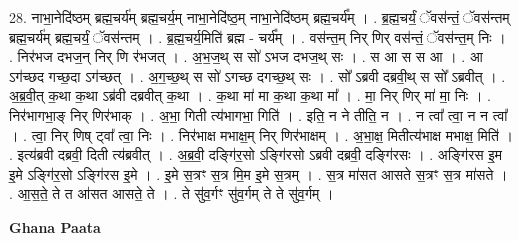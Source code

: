 \documentclass[17pt]{extarticle}
\begin{document}
28. नाभा॒नेदि॑ष्ठम् ब्रह्म॒चर्य॑म् ब्रह्म॒चर्य॒म् नाभा॒नेदि॑ष्ठ॒म् नाभा॒नेदि॑ष्ठम् ब्रह्म॒चर्य᳚म् । . ब्र॒ह्म॒चर्यं॒ ॅवस॑न्तं॒ ॅवस॑न्तम् ब्रह्म॒चर्य॑म् ब्रह्म॒चर्यं॒ ॅवस॑न्तम् । . ब्र॒ह्म॒चर्य॒मिति॑ ब्रह्म - चर्य᳚म् । . वस॑न्त॒म् निर् णिर् वस॑न्तं॒ ॅवस॑न्त॒म् निः । . निर॑भज दभज॒न् निर् णि र॑भजत् । . अ॒भ॒ज॒थ् स सो॑ ऽभज दभज॒थ् सः । . स आ स स आ । . आ ऽग॑च्छद गच्छ॒दा ऽग॑च्छत् । . अ॒ग॒च्छ॒थ् स सो॑ ऽगच्छ दगच्छ॒थ् सः । . सो᳚ ऽब्रवी दब्रवी॒थ् स सो᳚ ऽब्रवीत् । . अ॒ब्र॒वी॒त् क॒था क॒था ऽब्र॑वी दब्रवीत् क॒था । . क॒था मा॑ मा क॒था क॒था मा᳚ । . मा॒ निर् णिर् मा॑ मा॒ निः । . निर॑भागभा॒ङ् निर् णिर॑भाक् । . अ॒भा॒ गिती त्य॑भागभा॒ गिति॑ । . इति॒ न ने तीति॒ न । . न त्वा᳚ त्वा॒ न न त्वा᳚ । . त्वा॒ निर् णिष् ट्वा᳚ त्वा॒ निः । . निर॑भाक्ष मभाक्ष॒म् निर् णिर॑भाक्षम् । . अ॒भा॒क्ष॒ मितीत्य॑भाक्ष मभाक्ष॒ मिति॑ । . इत्य॑ब्रवी दब्रवी॒ दिती त्य॑ब्रवीत् । . अ॒ब्र॒वी॒ दङ्गि॑र॒सो ऽङ्गि॑रसो ऽब्रवी दब्रवी॒ दङ्गि॑रसः । . अङ्गि॑रस इ॒म इ॒मे ऽङ्गि॑र॒सो ऽङ्गि॑रस इ॒मे । . इ॒मे स॒त्रꣳ स॒त्र मि॒म इ॒मे स॒त्रम् । . स॒त्र मा॑सत आसते स॒त्रꣳ स॒त्र मा॑सते । . आ॒स॒ते॒ ते त आ॑सत आसते॒ ते । . ते सु॑व॒र्गꣳ सु॑व॒र्गम् ते ते सु॑व॒र्गम् । \newline

\textbf{Ghana Paata } \newline
\end{document}
